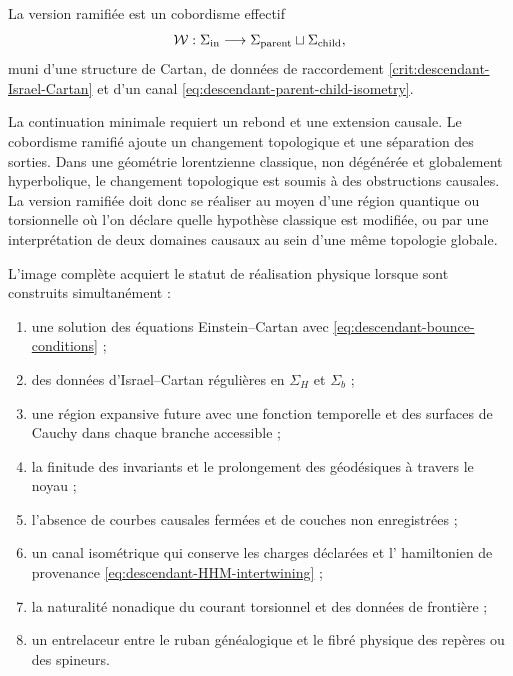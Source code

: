 \begin{definition}
\label{def:descendant-cobordism}
La version ramifiée est un cobordisme effectif
\begin{equation}
 \mathcal W:\Sigma_{\rm in}\longrightarrow
 \Sigma_{\rm parent}\sqcup\Sigma_{\rm child},
 \label{eq:descendant-cobordism}
\end{equation}
muni d'une structure de Cartan, de données de raccordement
\cref{crit:descendant-Israel-Cartan} et d'un canal
\cref{eq:descendant-parent-child-isometry}.
\end{definition}

La continuation minimale requiert un rebond et une extension causale. Le
cobordisme ramifié ajoute un changement topologique et une séparation des sorties.
Dans une géométrie lorentzienne classique, non dégénérée et globalement
hyperbolique, le changement topologique est soumis à des obstructions causales.
La version ramifiée doit donc se réaliser au moyen d'une région
quantique ou torsionnelle où l'on déclare quelle hypothèse classique est modifiée,
ou par une interprétation de deux domaines causaux au sein d'une même
topologie globale.

\begin{criterion}
\label{crit:descendant-promotion}
L'image complète acquiert le statut de réalisation physique lorsque sont
construits simultanément :
\begin{enumerate}[label=\roman*)]
 \item une solution des équations Einstein--Cartan avec
       \cref{eq:descendant-bounce-conditions} ;
 \item des données d'Israel--Cartan régulières en \(\Sigma_H\) et \(\Sigma_b\) ;
 \item une région expansive future avec une fonction temporelle et des surfaces de
       Cauchy dans chaque branche accessible ;
 \item la finitude des invariants et le prolongement des géodésiques à travers le
       noyau ;
 \item l'absence de courbes causales fermées et de couches non enregistrées ;
 \item un canal isométrique qui conserve les charges déclarées et l'
       hamiltonien de provenance \cref{eq:descendant-HHM-intertwining} ;
 \item la naturalité nonadique du courant torsionnel et des données de
       frontière ;
 \item un entrelaceur entre le ruban généalogique et le fibré physique des
       repères ou des spineurs.
\end{enumerate}
\end{criterion}


